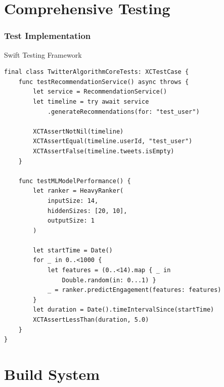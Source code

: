 \documentclass[aspectratio=169]{beamer}
\begin{document}
\section{Comprehensive Testing}

\begin{frame}
    \frametitle{Test Implementation}
    \begin{block}{Swift Testing Framework}
        \begin{verbatim}
final class TwitterAlgorithmCoreTests: XCTestCase {
    func testRecommendationService() async throws {
        let service = RecommendationService()
        let timeline = try await service
            .generateRecommendations(for: "test_user")
        
        XCTAssertNotNil(timeline)
        XCTAssertEqual(timeline.userId, "test_user")
        XCTAssertFalse(timeline.tweets.isEmpty)
    }
    
    func testMLModelPerformance() {
        let ranker = HeavyRanker(
            inputSize: 14,
            hiddenSizes: [20, 10],
            outputSize: 1
        )
        
        let startTime = Date()
        for _ in 0..<1000 {
            let features = (0..<14).map { _ in 
                Double.random(in: 0...1) }
            _ = ranker.predictEngagement(features: features)
        }
        let duration = Date().timeIntervalSince(startTime)
        XCTAssertLessThan(duration, 5.0)
    }
}
        \end{verbatim}
    \end{block}
\end{frame}

\section{Build System}
\end{document}
